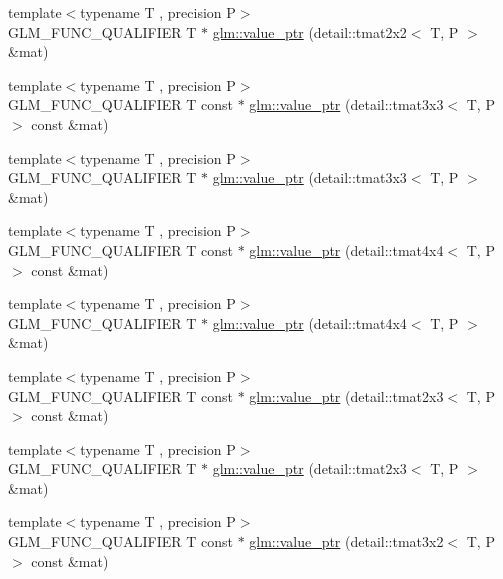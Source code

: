 \begin{DoxyCompactItemize}
\item 
{\footnotesize template$<$typename T , precision P$>$ }\\G\+L\+M\+\_\+\+F\+U\+N\+C\+\_\+\+Q\+U\+A\+L\+I\+F\+I\+ER T $\ast$ \hyperlink{group__gtc__type__ptr_ga11e5b6c0d7d5d2627df624bb4b219f20}{glm\+::value\+\_\+ptr} (detail\+::tmat2x2$<$ T, P $>$ \&mat)
\item 
{\footnotesize template$<$typename T , precision P$>$ }\\G\+L\+M\+\_\+\+F\+U\+N\+C\+\_\+\+Q\+U\+A\+L\+I\+F\+I\+ER T const $\ast$ \hyperlink{group__gtc__type__ptr_ga78acb1fd15ce7d1d2861493fac9693ec}{glm\+::value\+\_\+ptr} (detail\+::tmat3x3$<$ T, P $>$ const \&mat)
\item 
{\footnotesize template$<$typename T , precision P$>$ }\\G\+L\+M\+\_\+\+F\+U\+N\+C\+\_\+\+Q\+U\+A\+L\+I\+F\+I\+ER T $\ast$ \hyperlink{group__gtc__type__ptr_gaad64150511d5c6a2d2c7afec724e4064}{glm\+::value\+\_\+ptr} (detail\+::tmat3x3$<$ T, P $>$ \&mat)
\item 
{\footnotesize template$<$typename T , precision P$>$ }\\G\+L\+M\+\_\+\+F\+U\+N\+C\+\_\+\+Q\+U\+A\+L\+I\+F\+I\+ER T const $\ast$ \hyperlink{group__gtc__type__ptr_gaa99522f78635f6949ebf82f065bafa94}{glm\+::value\+\_\+ptr} (detail\+::tmat4x4$<$ T, P $>$ const \&mat)
\item 
{\footnotesize template$<$typename T , precision P$>$ }\\G\+L\+M\+\_\+\+F\+U\+N\+C\+\_\+\+Q\+U\+A\+L\+I\+F\+I\+ER T $\ast$ \hyperlink{group__gtc__type__ptr_ga46c85fe444b7260c496be5fe0c146e87}{glm\+::value\+\_\+ptr} (detail\+::tmat4x4$<$ T, P $>$ \&mat)
\item 
{\footnotesize template$<$typename T , precision P$>$ }\\G\+L\+M\+\_\+\+F\+U\+N\+C\+\_\+\+Q\+U\+A\+L\+I\+F\+I\+ER T const $\ast$ \hyperlink{group__gtc__type__ptr_gad5c4faad7a4553c875bc45656fcae73c}{glm\+::value\+\_\+ptr} (detail\+::tmat2x3$<$ T, P $>$ const \&mat)
\item 
{\footnotesize template$<$typename T , precision P$>$ }\\G\+L\+M\+\_\+\+F\+U\+N\+C\+\_\+\+Q\+U\+A\+L\+I\+F\+I\+ER T $\ast$ \hyperlink{group__gtc__type__ptr_gaaba8179ff5559d8b4493499313eb7a02}{glm\+::value\+\_\+ptr} (detail\+::tmat2x3$<$ T, P $>$ \&mat)
\item 
{\footnotesize template$<$typename T , precision P$>$ }\\G\+L\+M\+\_\+\+F\+U\+N\+C\+\_\+\+Q\+U\+A\+L\+I\+F\+I\+ER T const $\ast$ \hyperlink{group__gtc__type__ptr_gaf8edbe29063a5b8221fc8afcb6af224d}{glm\+::value\+\_\+ptr} (detail\+::tmat3x2$<$ T, P $>$ const \&mat)

\end{DoxyCompactItemize}
